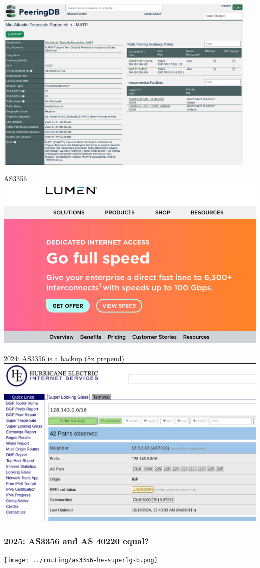 \begin{frame}{}
\includegraphics[width=0.95\textwidth]{../routing/as40220-peeringdb}
\end{frame}

\begin{frame}{AS3356}
\includegraphics[height=0.8\textheight]{../routing/lumen-webpage.png}
\end{frame}

\begin{frame}{2024: AS3356 is a backup (8x prepend)}
\includegraphics[height=0.8\textheight]{../routing/as3356-he-superlg.png}
\end{frame}

\begin{frame}
\frametitle{2025: AS3356 and AS 40220 equal?}
\texttt{[image: ../routing/as3356-he-superlg-b.png]}
\end{frame}
